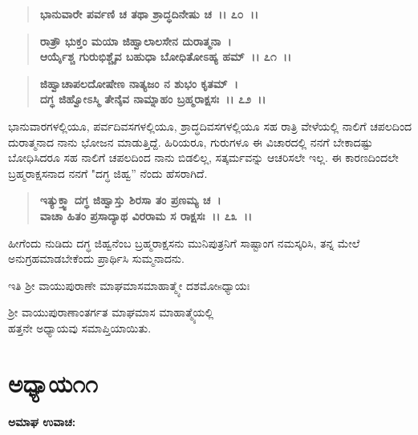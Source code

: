 \vauthor{\textbf{(ಶ‍್ರೀ ಕೃಷ್ಣಾಮೃತಮಹಾರ್ಣವ)]}}

\begin{verse}
\textbf{ಭಾನುವಾರೇ ಪರ್ವಣಿ ಚ ತಥಾ ಶ್ರಾದ್ಧದಿನೇಷು ಚ~।। ೭೦~।।} 
\end{verse}

\begin{verse}
\textbf{ರಾತ್ರೌ ಭುಕ್ತಂ ಮಯಾ ಜಿಹ್ವಾಲಾಲಸೇನ ದುರಾತ್ಮನಾ~।}\\\textbf{ಆರ್ಯೈಶ್ಚ ಗುರುಭಿಶ್ಚೈವ ಬಹುಧಾ ಬೋಧಿತೋಽಹ್ಯ ಹಮ್~।। ೭೧~।। }
\end{verse}

\begin{verse}
\textbf{ಜಿಹ್ವಾಚಾಪಲದೋಷೇಣ ನಾತ್ಯಜಂ ನ ಶುಭಂ ಕೃತಮ್~।}\\\textbf{ದಗ್ಧ ಜಿಹ್ವೋಽಸ್ಮಿ ತೇನೈವ ನಾಮ್ನಾಹಂ ಬ್ರಹ್ಮರಾಕ್ಷಸಃ~।। ೭೨~।।}
\end{verse}

ಭಾನುವಾರಗಳಲ್ಲಿಯೂ, ಪರ್ವದಿವಸಗಳಲ್ಲಿಯೂ, ಶ್ರಾದ್ಧದಿವಸಗಳಲ್ಲಿಯೂ ಸಹ ರಾತ್ರಿ ವೇಳೆಯಲ್ಲಿ ನಾಲಿಗೆ ಚಪಲದಿಂದ ದುರಾತ್ಮನಾದ ನಾನು ಭೋಜನ ಮಾಡುತ್ತಿದ್ದೆ. ಹಿರಿಯರೂ, ಗುರುಗಳೂ ಈ ವಿಚಾರದಲ್ಲಿ ನನಗೆ ಬೇಕಾದಷ್ಟು ಬೋಧಿಸಿದರೂ ಸಹ ನಾಲಿಗೆ ಚಪಲದಿಂದ ನಾನು ಬಿಡಲಿಲ್ಲ, ಸತ್ಕರ್ಮವನ್ನು ಆಚರಿಸಲೇ ಇಲ್ಲ. ಈ ಕಾರಣದಿಂದಲೇ ಬ್ರಹ್ಮರಾಕ್ಷಸನಾದ ನನಗೆ "ದಗ್ಧ ಜಿಹ್ವ” ನೆಂದು ಹೆಸರಾಗಿದೆ.

\begin{verse}
\textbf{ಇತ್ಯುಕ್ತ್ವಾ ದಗ್ಧ ಜಿಹ್ವಾಸ್ತು ಶಿರಸಾ ತಂ ಪ್ರಣಮ್ಯ ಚ~।}\\\textbf{ವಾಚಾ ಹಿತಂ ಪ್ರಸಾದ್ಯಾಥ ವಿರರಾಮ ಸ ರಾಕ್ಷಸಃ~।। ೭೩~।।}
\end{verse}

ಹೀಗೆಂದು ನುಡಿದು ದಗ್ಧ ಜಿಹ್ವನೆಂಬ ಬ್ರಹ್ಮರಾಕ್ಷಸನು ಮುನಿಪುತ್ರನಿಗೆ ಸಾಷ್ಟಾಂಗ ನಮಸ್ಕರಿಸಿ, ತನ್ನ ಮೇಲೆ ಅನುಗ್ರಹಮಾಡಬೇಕೆಂದು ಪ್ರಾರ್ಥಿಸಿ ಸುಮ್ಮನಾದನು.

\begin{center}
ಇತಿ ಶ‍್ರೀ ವಾಯುಪುರಾಣೇ ಮಾಘಮಾಸಮಾಹಾತ್ಮ್ಯೇ ದಶಮೋsಧ್ಯಾಯಃ
\end{center}

\begin{center}
ಶ‍್ರೀ ವಾಯುಪುರಾಣಾಂತರ್ಗತ ಮಾಘಮಾಸ ಮಾಹಾತ್ಮ್ಯೆಯಲ್ಲಿ \\ ಹತ್ತನೇ ಅಧ್ಯಾಯವು ಸಮಾಪ್ತಿಯಾಯಿತು.
\end{center}

\newpage

\section*{ಅಧ್ಯಾಯ\enginline{-}೧೧}

\emptypage

\begin{flushleft}
\textbf{ಅಮಾಘ ಉವಾಚ:\enginline{-} }
\end{flushleft}

